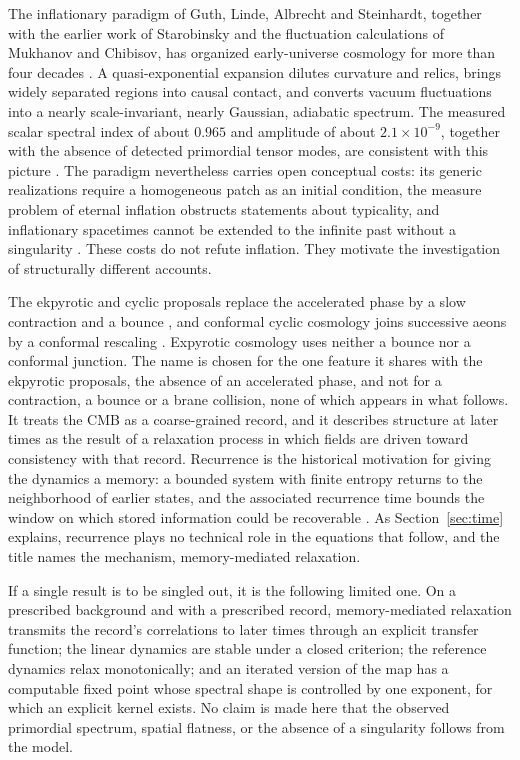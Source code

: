 \documentclass[11pt]{article}
\theoremstyle{definition}
\theoremstyle{remark}
\begin{document}
The inflationary paradigm of Guth, Linde, Albrecht and Steinhardt, together with the earlier work of Starobinsky and the fluctuation calculations of Mukhanov and Chibisov, has organized early-universe cosmology for more than four decades \cite{guth1981,linde1982,albrecht1982,starobinsky1980,mukhanov1981}. A quasi-exponential expansion dilutes curvature and relics, brings widely separated regions into causal contact, and converts vacuum fluctuations into a nearly scale-invariant, nearly Gaussian, adiabatic spectrum. The measured scalar spectral index of about $0.965$ and amplitude of about $2.1\times10^{-9}$, together with the absence of detected primordial tensor modes, are consistent with this picture \cite{planck2018vi,planck2018x}. The paradigm nevertheless carries open conceptual costs: its generic realizations require a homogeneous patch as an initial condition, the measure problem of eternal inflation obstructs statements about typicality, and inflationary spacetimes cannot be extended to the infinite past without a singularity \cite{ijjas2013,borde2003,albrecht2004}. These costs do not refute inflation. They motivate the investigation of structurally different accounts.

The ekpyrotic and cyclic proposals replace the accelerated phase by a slow contraction and a bounce \cite{khoury2001,steinhardt2002}, and conformal cyclic cosmology joins successive aeons by a conformal rescaling \cite{penrose2010}. Expyrotic cosmology uses neither a bounce nor a conformal junction. The name is chosen for the one feature it shares with the ekpyrotic proposals, the absence of an accelerated phase, and not for a contraction, a bounce or a brane collision, none of which appears in what follows. It treats the CMB as a coarse-grained record, and it describes structure at later times as the result of a relaxation process in which fields are driven toward consistency with that record. Recurrence is the historical motivation for giving the dynamics a memory: a bounded system with finite entropy returns to the neighborhood of earlier states, and the associated recurrence time bounds the window on which stored information could be recoverable \cite{poincare1890,kac1947}. As Section~\ref{sec:time} explains, recurrence plays no technical role in the equations that follow, and the title names the mechanism, memory-mediated relaxation.


If a single result is to be singled out, it is the following limited one. On a prescribed background and with a prescribed record, memory-mediated relaxation transmits the record's correlations to later times through an explicit transfer function; the linear dynamics are stable under a closed criterion; the reference dynamics relax monotonically; and an iterated version of the map has a computable fixed point whose spectral shape is controlled by one exponent, for which an explicit kernel exists. No claim is made here that the observed primordial spectrum, spatial flatness, or the absence of a singularity follows from the model.
\end{document}
